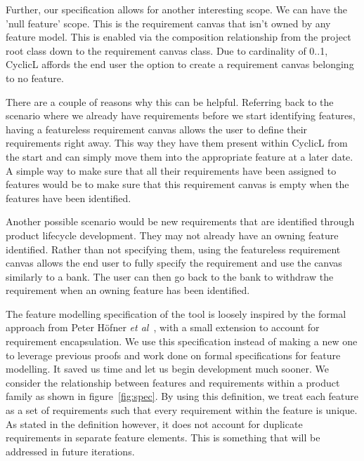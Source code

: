 Further, our specification allows for another interesting scope. We can have the 'null feature' scope. This is the requirement canvas that isn't owned by any feature model. This is enabled via the composition relationship from the project root class down to the requirement canvas class. Due to cardinality of 0..1, CyclicL affords the end user the option to create a requirement canvas belonging to no feature. 

There are a couple of reasons why this can be helpful. Referring back to the scenario where we already have requirements before we start identifying features, having a featureless requirement canvas allows the user to define their requirements right away. This way they have them present within CyclicL from the start and can simply move them into the appropriate feature at a later date. A simple way to make sure that all their requirements have been assigned to features would be to make sure that this requirement canvas is empty when the features have been identified.

Another possible scenario would be new requirements that are identified through product lifecycle development. They may not already have an owning feature identified. Rather than not specifying them, using the featureless requirement canvas allows the end user to fully specify the requirement and use the canvas similarly to a bank. The user can then go back to the bank to withdraw the requirement when an owning feature has been identified. 


The feature modelling specification of the tool is loosely inspired by the formal approach from Peter H\"{o}fner \textit{et al}~\cite{hofner2006feature,hofner2011algebra}, with a small extension to account for requirement encapsulation. We use this specification instead of making a new one to leverage previous proofs and work done on formal specifications for feature modelling. It saved us time and let us begin development much sooner. We consider the relationship between features and requirements within a product family as shown in figure~\ref{fig:spec}. By using this definition, we treat each feature as a set of requirements such that every requirement within the feature is unique. As stated in the definition however, it does not account for duplicate requirements in separate feature elements. This is something that will be addressed in future iterations. 


